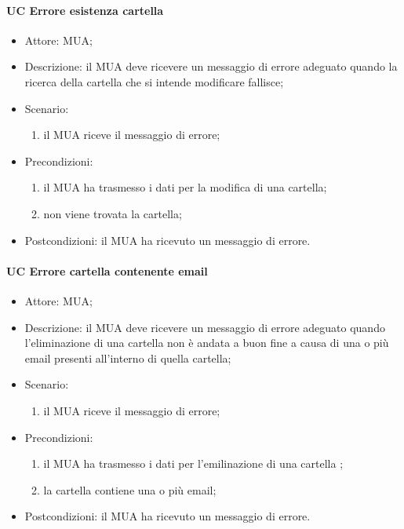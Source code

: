     \paragraph{UC Errore esistenza cartella} \label{sec: UC 11.4.2.1}
    \begin{itemize}
        \item Attore: MUA;
        \item Descrizione: il MUA deve ricevere un messaggio di errore adeguato quando la ricerca della cartella che si intende modificare fallisce;
        \item Scenario:
        \begin{enumerate}
        \item il MUA riceve il messaggio di errore;
        \end{enumerate}   
        \item Precondizioni: 
        \begin{enumerate}
            \item il MUA ha trasmesso i dati per la modifica di una cartella;
            \item non viene trovata la cartella;
        \end{enumerate}
        \item Postcondizioni: il MUA ha ricevuto un messaggio di errore.
    \end{itemize}

    \paragraph{UC Errore cartella contenente email} \label{sec: UC 11.4.2.1}
    \begin{itemize}
        \item Attore: MUA;
        \item Descrizione: il MUA deve ricevere un messaggio di errore adeguato quando l'eliminazione di una cartella non è andata a buon fine a causa di una o più email presenti all'interno di quella cartella;
        \item Scenario:
        \begin{enumerate}
        \item il MUA riceve il messaggio di errore;
        \end{enumerate}   
        \item Precondizioni: 
        \begin{enumerate}
            \item il MUA ha trasmesso i dati per l'emilinazione di una cartella ;
            \item la cartella contiene una o più email;
        \end{enumerate}
        \item Postcondizioni: il MUA ha ricevuto un messaggio di errore.
    \end{itemize}

